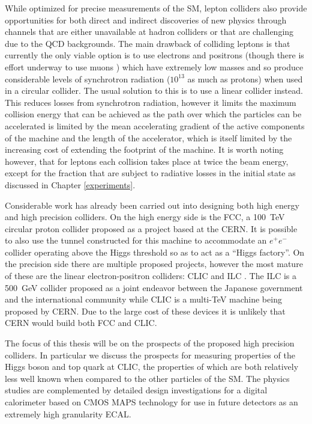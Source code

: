 While optimized for precise measurements of the \ac{SM}, lepton colliders also provide opportunities for both direct and indirect discoveries of new physics through channels that are either unavailable at hadron colliders or that are challenging due to the \ac{QCD} backgrounds. The main drawback of colliding leptons is that currently the only viable option is to use electrons and positrons (though there is effort underway to use muons \cite{Bogomilov:2017vwz}) which have extremely low masses and so produce considerable levels of synchrotron radiation (${10^{13}}$ as much as protons) when used in a circular collider. The usual solution to this is to use a linear collider instead. This reduces losses from synchrotron radiation, however it limits the maximum collision energy that can be achieved as the path over which the particles can be accelerated is limited by the mean accelerating gradient of the active components of the machine and the length of the accelerator, which is itself limited by the increasing cost of extending the footprint of the machine. It is worth noting however, that for leptons each collision takes place at twice the beam energy, except for the fraction that are subject to radiative losses in the initial state as discussed in Chapter \ref{experiments}.

Considerable work has already been carried out into designing both high energy and high precision colliders. On the high energy side is the \ac{FCC}, a 100~TeV circular proton collider proposed as a project based at the \ac{CERN}. It is possible to also use the tunnel constructed for this machine to accommodate an $e^+e^-$ collider operating above the Higgs threshold so as to act as a ``Higgs factory''. On the precision side there are multiple proposed projects, however the most mature of these are the linear electron-positron colliders: \ac{CLIC} \cite{CLIC:2016zwp} and \ac{ILC} \cite{ILCTDR}. The \ac{ILC} is a 500~GeV collider proposed as a joint endeavor between the Japanese government and the international community while \ac{CLIC} is a multi-TeV machine being proposed by \ac{CERN}. Due to the large cost of these devices it is unlikely that \ac{CERN} would build both \ac{FCC} and \ac{CLIC}.

The focus of this thesis will be on the prospects of the proposed high precision colliders. In particular we discuss the prospects for measuring properties of the Higgs boson and top quark at \ac{CLIC}, the properties of which are both relatively less well known when compared to the other particles of the \ac{SM}. The physics studies are complemented by detailed design investigations for a digital calorimeter based on \ac{CMOS} \ac{MAPS} technology for use in future detectors as an extremely high granularity \ac{ECAL}.  


 
